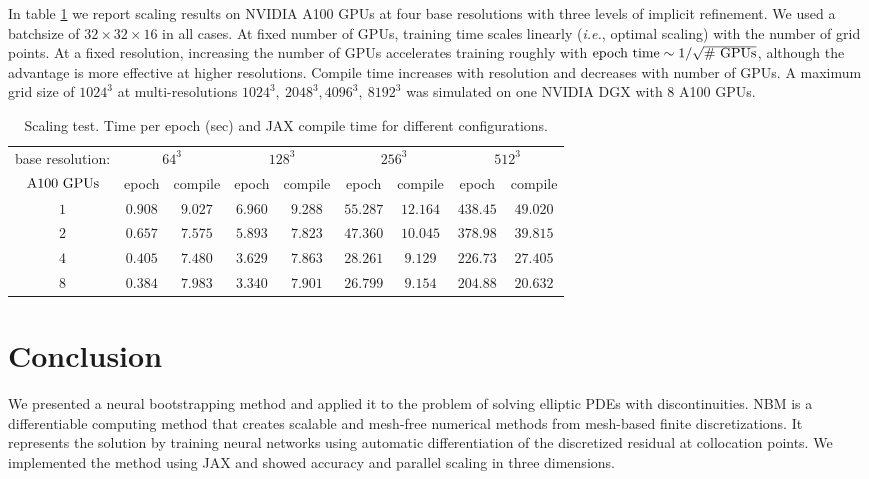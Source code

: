 \documentclass{article}
\begin{document}
In table \ref{tab:scaling} we report scaling results on NVIDIA A100 GPUs at four base resolutions with three levels of implicit refinement. We used a batchsize of $32\times 32\times 16$ in all cases. At fixed number of GPUs, training time scales linearly (\textit{i.e.}, optimal scaling) with the number of grid points. At a fixed resolution, increasing the number of GPUs accelerates training roughly with $\rm epoch\ time \sim 1/\sqrt{\text{\# }GPUs}$, although the advantage is more effective at higher resolutions. Compile time increases with resolution and decreases with number of GPUs. A maximum grid size of $1024^3$ at multi-resolutions $1024^3,\ 2048^3, 4096^3,\ 8192^3$ was simulated on one NVIDIA DGX with 8 A100 GPUs. 

\begin{table}[ht]
\begin{center}
\caption{Scaling test. Time per epoch (sec) and JAX compile time for different configurations.} \label{tab:scaling}
\begin{tabular}{ccccccccc}
\toprule
base resolution: & \multicolumn{2}{c}{$64^3$}& \multicolumn{2}{c}{$128^3$} & \multicolumn{2}{c}{$256^3$}  & \multicolumn{2}{c}{$512^3$}\\
\cmidrule(r){1-1}\cmidrule(r){2-3}\cmidrule(r){4-5}\cmidrule(r){6-7}\cmidrule(r){8-9}
$\rm A100\ GPUs$ &  epoch  &  compile   &  epoch   & compile &    epoch & compile  &  epoch    &   compile \\
\cmidrule(r){1-1}\cmidrule(r){2-3}\cmidrule(r){4-5}\cmidrule(r){6-7}\cmidrule(r){8-9} 
$1$        & $0.908$ &  $9.027$   & $6.960$  & $9.288$ & $55.287$ & $12.164$ &  $438.45$  &  $49.020$ \\
$2$        & $0.657$ &  $7.575$   & $5.893$  & $7.823$ & $47.360$ & $10.045$ &  $378.98$  &  $39.815$ \\ 
$4$        & $0.405$ &  $7.480$   & $3.629$  & $7.863$ & $28.261$ & $9.129$  &  $226.73$  &  $27.405$ \\ 
$8$        & $0.384$ &  $7.983$   & $3.340$  & $7.901$ & $26.799$ & $9.154$  &  $204.88$  &  $20.632$\\ \bottomrule
\end{tabular}
\end{center}
\end{table}


\section{Conclusion}
We presented a neural bootstrapping method and applied it to the problem of solving elliptic PDEs with discontinuities. NBM is a differentiable computing method that creates scalable and mesh-free numerical methods from mesh-based finite discretizations. It represents the solution by training neural networks using automatic differentiation of the discretized residual at collocation points. We implemented the method using JAX and showed accuracy and parallel scaling in three dimensions.
\end{document}
